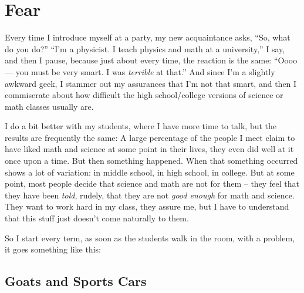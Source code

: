 \section{Fear}

Every time I introduce myself at a party, my new acquaintance asks,
``So, what do you do?''  ``I'm a physicist. I teach physics and math
at a university,'' I say, and then I pause, because just about every
time, the reaction is the same: ``Oooo --- you must be very smart.  I
was \emph{terrible} at that.''  And since I'm a slightly awkward geek,
I stammer out my assurances that I'm not that smart, and then I
commiserate about how difficult the high school/college versions of
science or math classes usually are. 


I do a bit better with my students, where I have more time to talk,
but the results are frequently the same: A large percentage of the
people I meet claim to have liked math and science at some point in
their lives, they even did well at it once upon a time.  But then
something happened.  When that something occurred shows a lot of
variation: in middle school, in high school, in college.  But at some
point, most people decide that science and math are not for them --
they feel that they have been \emph{told}, rudely, that they are not
\emph{good enough} for math and science.  They want to work hard in my
class, they assure me, but I have to understand that this stuff just
doesn't come naturally to them.


So I start every term, as soon as the students walk in the room, with a
problem, it goes something like this:

\subsection{Goats and Sports Cars}







